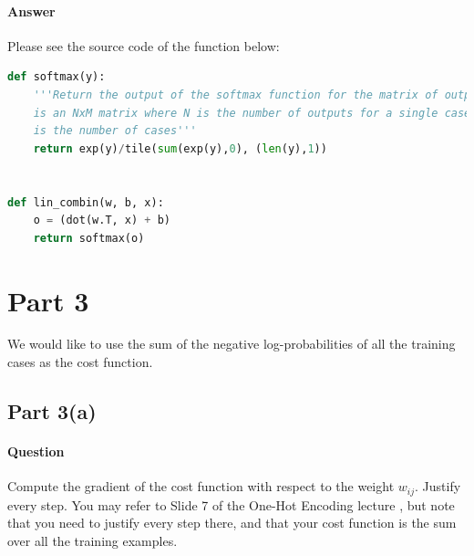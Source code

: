 \documentclass[11pt,twoside]{article}
\begin{document}
\paragraph{Answer}
Please see the source code of the function below:

\begin{lstlisting}[language=Python]
def softmax(y):
    '''Return the output of the softmax function for the matrix of output y. y
    is an NxM matrix where N is the number of outputs for a single case, and M
    is the number of cases'''
    return exp(y)/tile(sum(exp(y),0), (len(y),1))


def lin_combin(w, b, x):
    o = (dot(w.T, x) + b)
    return softmax(o)
\end{lstlisting}


\clearpage

\section*{Part 3}
We would like to use the sum of the negative log-probabilities of all the training cases as the cost function.

\subsection*{Part 3(a)}
\paragraph{Question}
Compute the gradient of the cost function with respect to the weight $w_{ij}$. Justify every step. You may refer to Slide 7 of the One-Hot Encoding lecture , but note that you need to justify every step there, and that your cost function is the sum over all the training examples.
\end{document}
